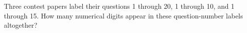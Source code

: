 Three contest papers label their questions 1 through 20, 1 through 10, and 1 through 15. How many numerical digits appear in these question-number labels altogether?
